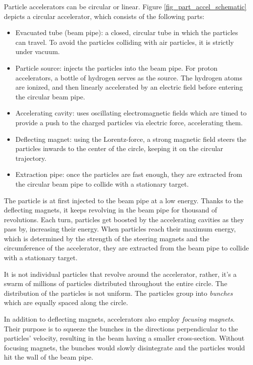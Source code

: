 \documentclass[12pt]{article}
\begin{document}
Particle accelerators can be circular or linear. Figure \ref{fig_part_accel_schematic} depicts a circular accelerator, which consists of the following parts:
\begin{itemize}
	\item Evacuated tube (beam pipe): a closed, circular tube in which the particles can travel. To avoid the particles colliding with air particles, it is strictly under vacuum.
	\item Particle source: injects the particles into the beam pipe. For proton accelerators, a bottle of hydrogen serves as the source. The hydrogen atoms are ionized, and then linearly accelerated by an electric field before entering the circular beam pipe.
	\item Accelerating cavity: uses oscillating electromagnetic fields which are timed to provide a push to the charged particles via electric force, accelerating them.
	\item Deflecting magnet: using the Lorentz-force, a strong magnetic field steers the particles inwards to the center of the circle, keeping it on the circular trajectory.
	\item Extraction pipe: once the particles are fast enough, they are extracted from the circular beam pipe to collide with a stationary target.
\end{itemize}

The particle is at first injected to the beam pipe at a low energy. Thanks to the deflecting magnets, it keeps revolving in the beam pipe for thousand of revolutions. Each turn, particles get boosted by the accelerating cavities as they pass by, increasing their energy. When particles reach their maximum energy, which is determined by the strength of the steering magnets and the circumference of the accelerator, they are extracted from the beam pipe to collide with a stationary target.

It is not individual particles that revolve around the accelerator, rather, it's a swarm of millions of particles distributed throughout the entire circle. The distribution of the particles is not uniform. The particles group into \textit{bunches} which are equally spaced along the circle.

In addition to deflecting magnets, accelerators also employ \textit{focusing magnets}. Their purpose is to squeeze the bunches in the directions perpendicular to the particles' velocity, resulting in the beam having a smaller cross-section. Without focusing magnets, the bunches would slowly disintegrate and the particles would hit the wall of the beam pipe.
\end{document}
